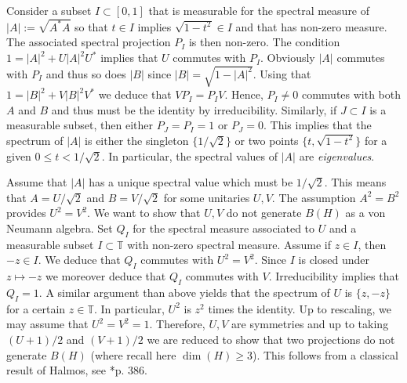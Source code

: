 \documentclass[12pt, a4paper]{amsart}
\def\dim{\operatorname{dim}}
\def\T{\mathbb{T}}
\numberwithin{equation}{section}
\begin{document}
Consider a subset $I\subset [0,1]$ that is measurable for the spectral measure of $|A|:=\sqrt{A^*A}$ so that $t\in I$ implies $\sqrt{1-t^2}\in I$ and that has non-zero measure.
The associated spectral projection $P_I$ is then non-zero.
The condition $1=|A|^2+U|A|^2U^*$ implies that $U$ commutes with $P_I.$
Obviously $|A|$ commutes with $P_I$ and thus so does $|B|$ since $|B|=\sqrt{1-|A|^2}.$
Using that $1=|B|^2+V|B|^2V^*$ we deduce that $VP_I=P_IV.$
Hence, $P_I\neq 0$ commutes with both $A$ and $B$ and thus must be the identity by irreducibility.
Similarly, if $J\subset I$ is a measurable subset, then either $P_J=P_I=1$ or $P_J=0.$
This implies that the spectrum of $|A|$ is either the singleton $\{1/\sqrt 2\}$ or two points $\{t,\sqrt{1-t^2}\}$ for a given $0\leq t<1/\sqrt 2.$
In particular, the spectral values of $|A|$ are \emph{eigenvalues}.

Assume that $|A|$ has a unique spectral value which must be $1/\sqrt 2$.
This means that $A=U/\sqrt 2$ and $B=V/\sqrt 2$ for some unitaries $U,V.$
The assumption $A^2=B^2$ provides $U^2=V^2.$
We want to show that $U,V$ do not generate $B(H)$ as a von Neumann algebra.
Set $Q_I$ for the spectral measure associated to $U$ and a measurable subset $I\subset \T$ with non-zero spectral measure.
Assume if $z\in I$, then $-z\in I$.
We deduce that $Q_I$ commutes with $U^2=V^2.$ 
Since $I$ is closed under $z\mapsto -z$ we moreover deduce that $Q_I$ commutes with $V$.
Irreducibility implies that $Q_I=1$. 
A similar argument than above yields that the spectrum of $U$ is $\{z,-z\}$ for a certain $z\in\T$.
In particular, $U^2$ is $z^2$ times the identity.
Up to rescaling, we may assume that $U^2=V^2=1.$
Therefore, $U,V$ are symmetries and up to taking $(U+1)/2$ and $(V+1)/2$ we are reduced to show that two projections do not generate $B(H)$ (where recall here $\dim(H)\geq 3$).
This follows from a classical result of Halmos, see \cite{Halmos69}*{p. 386}.
\end{document}
